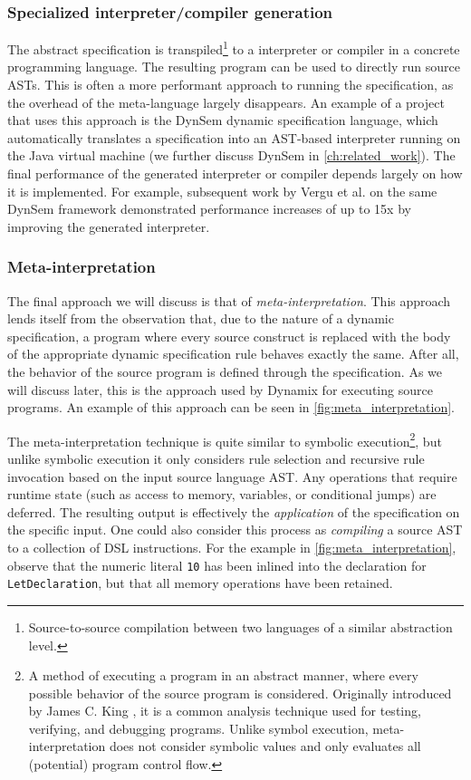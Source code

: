 \subsubsection*{Specialized interpreter/compiler generation} The abstract specification is transpiled\footnote{Source-to-source compilation between two languages of a similar abstraction level.} to a interpreter or compiler in a concrete programming language. The resulting program can be used to directly run source ASTs. This is often a more performant approach to running the specification, as the overhead of the meta-language largely disappears. An example of a project that uses this approach is the DynSem \cite{VerguNV15} dynamic specification language, which automatically translates a specification into an AST-based interpreter running on the Java virtual machine (we further discuss DynSem in \cref{ch:related_work}). The final performance of the generated interpreter or compiler depends largely on how it is implemented. For example, subsequent work by Vergu et al. \cite{VerguV18} on the same DynSem framework demonstrated performance increases of up to 15x by improving the generated interpreter.

\subsubsection*{Meta-interpretation} The final approach we will discuss is that of \textit{meta-interpretation}. This approach lends itself from the observation that, due to the nature of a dynamic specification, a program where every source construct is replaced with the body of the appropriate dynamic specification rule behaves exactly the same. After all, the behavior of the source program is defined through the specification. As we will discuss later, this is the approach used by Dynamix for executing source programs. An example of this approach can be seen in \cref{fig:meta_interpretation}.

The meta-interpretation technique is quite similar to symbolic execution\footnote{A method of executing a program in an abstract manner, where every possible behavior of the source program is considered. Originally introduced by James C. King \cite{King76:0}, it is a common analysis technique used for testing, verifying, and debugging programs. Unlike symbol execution, meta-interpretation does not consider symbolic values and only evaluates all (potential) program control flow.}, but unlike symbolic execution it only considers rule selection and recursive rule invocation based on the input source language \ac{AST}. Any operations that require runtime state (such as access to memory, variables, or conditional jumps) are deferred. The resulting output is effectively the \textit{application} of the specification on the specific input. One could also consider this process as \textit{compiling} a source AST to a collection of \ac{DSL} instructions. For the example in \cref{fig:meta_interpretation}, observe that the numeric literal \texttt{10} has been inlined into the declaration for \texttt{LetDeclaration}, but that all memory operations have been retained.

